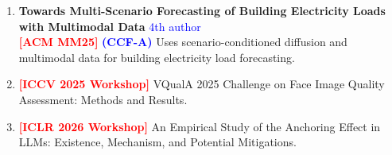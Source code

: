 \begin{enumerate}
\item \textbf{Towards Multi-Scenario Forecasting of Building Electricity Loads with Multimodal Data} \hfill \textcolor{blue}{4th author} \\
\textbf{\textcolor{red}{[ACM MM25]}} 
\textbf{\textcolor{blue}{(CCF-A)}}
Uses scenario-conditioned diffusion and multimodal data for building electricity load forecasting.

\item \textbf{\textcolor{red}{[ICCV 2025 Workshop]}} VQualA 2025 Challenge on Face Image Quality Assessment: Methods and Results. \hfill
\item \textbf{\textcolor{red}{[ICLR 2026 Workshop]}} An Empirical Study of the Anchoring Effect in LLMs: Existence, Mechanism, and Potential Mitigations.\hfill
\end{enumerate}
